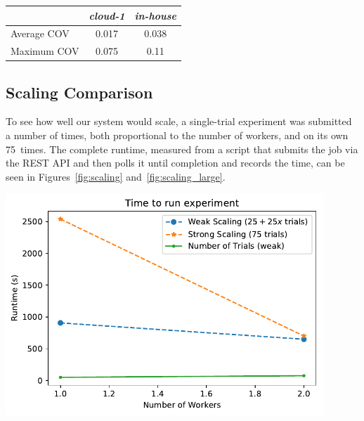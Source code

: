 \documentclass[a4paper]{IEEEtran}
\begin{document}
\begin{Figure}
  \centering
  \begin{tabular}{|l|c|c|}
    \hline
    & \emph{cloud-1} & \emph{in-house} \\
  \hline
  Average COV & 0.017 & 0.038 \\
  \hline
  Maximum COV  & 0.075 & 0.11 \\
  \hline
\end{tabular}
\label{tbl:complete2}
\end{Figure}


\subsection{Scaling Comparison}
To see how well our system would scale, a single-trial experiment was
submitted a number of times, both proportional to the number of
workers, and on its own 75~times. The complete runtime, measured from
a script that submits the job via the REST API and then polls it until
completion and records the time, can be seen in Figures~\ref{fig:scaling} and~\ref{fig:scaling_large}.
\begin{Figure}
  \centering \includegraphics[width=0.9\textwidth]{scaling_graph}
  \label{fig:scaling}
\end{Figure}
\end{document}

